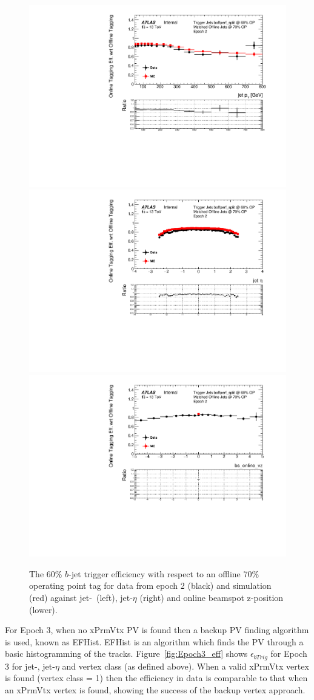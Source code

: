 \begin{figure}[!ht]
\begin{center}
  \includegraphics[width=0.45\linewidth, angle=0]{figs/Trigger/btrigger_old/Epoch2_trigReq_eff_jetPt.pdf}
  \includegraphics[width=0.45\linewidth, angle=0]{figs/Trigger/btrigger_old/Epoch2_trigReq_eff_jetEta.pdf} \\
  \includegraphics[width=0.45\linewidth, angle=0]{figs/Trigger/btrigger_old/Epoch2_trigReq_eff_bs_online_vz.pdf}
\end{center}
\caption{The 60\% $b$-jet trigger efficiency with respect to an offline 70\% operating point tag
         for data from epoch 2 (black) and simulation (red) against jet-\pT~(left), jet-$\eta$ (right) and online beamspot z-position (lower).}
\label{fig:Epoch2_eff}
\end{figure}

For Epoch 3, when no xPrmVtx PV is found then a backup PV finding algorithm is used, known as EFHist.
EFHist is an algorithm which finds the PV through a basic histogramming of the tracks.
Figure~\ref{fig:Epoch3_eff} shows $\epsilon_{bTrig}$ for Epoch 3 for jet-\pT, jet-$\eta$ and vertex class (as defined above).
When a valid xPrmVtx vertex is found (vertex class = 1) then the efficiency in data is comparable to that when an xPrmVtx vertex is found,
showing the success of the backup vertex approach.

